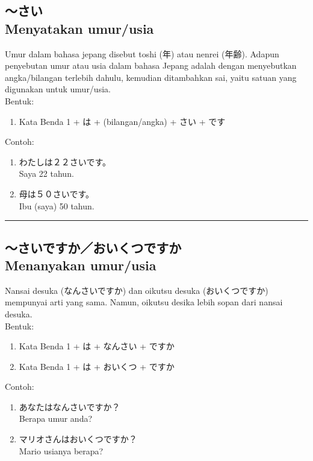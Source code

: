 \subsection*{
    ～さい \\
    Menyatakan umur/usia
}
Umur dalam bahasa jepang disebut toshi (年) atau nenrei (年齢).
Adapun penyebutan umur atau usia dalam bahasa Jepang adalah dengan 
menyebutkan angka/bilangan terlebih dahulu, kemudian ditambahkan sai, 
yaitu satuan yang digunakan untuk umur/usia.\\
Bentuk:
\begin{enumerate}
    \item Kata Benda 1 + は + (bilangan/angka) + さい + です
\end{enumerate}
Contoh: 
\begin{enumerate}
    \item わたしは２２さいです。
    \\ Saya 22 tahun.
    \item 母は５０さいです。
    \\ Ibu (saya) 50 tahun.
\end{enumerate}

\vspace{0.2cm}\hrule height 1pt\vspace{0.2cm}


\subsection*{
    ～さいですか／おいくつですか \\
    Menanyakan umur/usia
}
Nansai desuka (なんさいですか) dan oikutsu desuka (おいくつですか) 
mempunyai arti yang sama. Namun, oikutsu desika lebih sopan dari nansai desuka.\\
Bentuk:
\begin{enumerate}
    \item Kata Benda 1 + は + なんさい + ですか
    \item Kata Benda 1 + は + おいくつ + ですか
\end{enumerate}
Contoh: 
\begin{enumerate}
    \item あなたはなんさいですか？
    \\ Berapa umur anda?
    \item マリオさんはおいくつですか？
    \\ Mario usianya berapa?
\end{enumerate}

